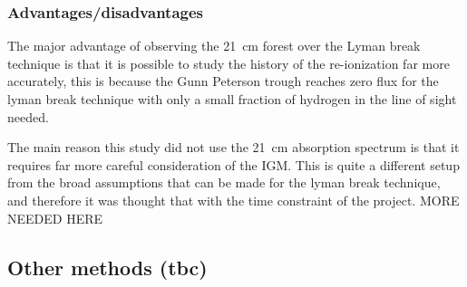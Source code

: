         \subsubsection{Advantages/disadvantages} %
    	\label{subsub:Advantages_disadvantages_21cm}
            The major advantage of observing the \SI{21}{\centi\metre} forest over the Lyman break technique is that it is possible to study the history of the re-ionization far more accurately, this is because the Gunn Peterson trough reaches zero flux for the lyman break technique with only a small fraction of hydrogen in the line of sight needed.

            The main reason this study did not use the \SI{21}{\centi\metre} absorption spectrum is that it requires far more careful consideration of the IGM. This is quite a different setup from the broad assumptions that can be made for the lyman break technique, and therefore it was thought that with the time constraint of the project. MORE NEEDED HERE


    \subsection{Other methods (tbc)} %
    \label{sub:Other_Methods_Re-ionization}


